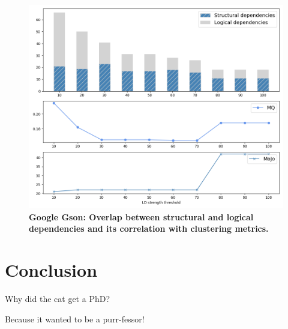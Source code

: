\documentclass{ieeeaccess}
\begin{document}
\begin{figure}[t!]
  \centering
  \includegraphics[width=\columnwidth]{gson_correlation.png}
  \caption{\textbf{Google Gson: Overlap between structural and logical dependencies and its correlation with clustering metrics.}}
  \label{fig:gson_correlation}
\end{figure}

\section{Conclusion}
\label{sec:conclusion}
Why did the cat get a PhD?

Because it wanted to be a purr-fessor!
\end{document}
